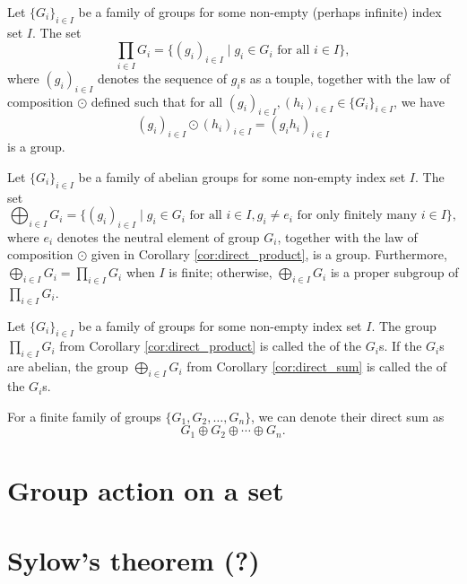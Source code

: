 \begin{cor}\label{cor:direct_product}
Let $ \{G_i\}_{i\in I} $ be a family of groups for some non-empty (perhaps infinite) index set $ I $. The set
\begin{equation*}
    \prod_{i\in I}G_i=\{(g_i)_{i\in I}\mid g_i\in G_i\text{ for all }i\in I\},
\end{equation*}
where $ (g_i)_{i\in I} $ denotes the sequence of $ g_i $s as a touple, together with the law of composition $ \odot $ defined such that for all $ (g_i)_{i\in I},(h_i)_{i\in I}\in\{G_i\}_{i\in I} $, we have
\begin{equation*}
    (g_i)_{i\in I}\odot(h_i)_{i\in I}=(g_ih_i)_{i\in I}
\end{equation*}
is a group.
\end{cor}

\begin{cor}\label{cor:direct_sum}
Let $ \{G_i\}_{i\in I} $ be a family of abelian groups for some non-empty index set $ I $. The set
\begin{equation*}
    \bigoplus_{i\in I}G_i=\{(g_i)_{i\in I}\mid g_i\in G_i\text{ for all }i\in I, g_i\neq e_i\text{ for only finitely many }i\in I\},
\end{equation*}
where $ e_i $ denotes the neutral element of group $ G_i $, together with the law of composition $ \odot $ given in Corollary \ref{cor:direct_product}, is a group. Furthermore, $ \bigoplus_{i\in I}G_i=\prod_{i\in I}G_i $ when $ I $ is finite; otherwise, $ \bigoplus_{i\in I}G_i $ is a proper subgroup of $ \prod_{i\in I}G_i $.
\end{cor}

\begin{defn}
Let $ \{G_i\}_{i\in I} $ be a family of groups for some non-empty index set $ I $. The group $ \prod_{i\in I}G_i $ from Corollary \ref{cor:direct_product} is called the  of the $ G_i $s. If the $ G_i $s are abelian, the group $ \bigoplus_{i\in I}G_i $ from Corollary \ref{cor:direct_sum} is called the  of the $ G_i $s.
\end{defn}

For a finite family of groups $ \{G_1,G_2,\ldots,G_n\} $, we can denote their direct sum as
\begin{equation*}
    G_1\oplus G_2\oplus\cdots\oplus G_n.
\end{equation*}

\section{Group action on a set}

\section{Sylow's theorem (?)}


